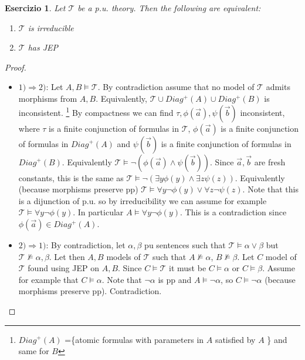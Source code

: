 \documentclass{article}
\newtheorem{exercise}{Esercizio}
\begin{document}
\begin{exercise}

	Let $\mathcal{T}$ be a p.u. theory. Then the following are equivalent:
	\begin{enumerate}
		\item	$\mathcal{T}$ is irreducible
		\item	$\mathcal{T}$ has JEP
	\end{enumerate}
\end{exercise}

\begin{proof}

	\begin{itemize}
		\item	$1) \Rightarrow 2)$: Let $A,B \models \mathcal{T}$. By contradiction assume that no model of $\mathcal{T}$
			admits morphisms from $A,B$. Equivalently, $\mathcal{T} \cup Diag^+(A) \cup Diag^+(B)$ is inconsistent.
			\footnote{$Diag^+(A)$ =\{atomic formulas with parameters in $A$ satisfied by $A$ \} and same for $B$}
			By compactness we can find $\tau, \phi(\vec{a}), \psi(\vec{b})$ inconsistent, where
			$\tau$ is a finite conjunction of formulas in $\mathcal{T}$, 
			$\phi(\vec{a})$ is a finite conjunction of formulas in $Diag^{+}(A)$ and
			$\psi(\vec{b})$ is a finite conjunction of formulas in $Diag^{+}(B)$.
			Equivalently $\mathcal{T} \models \neg(\phi(\vec{a}) \land \psi(\vec{b}))$.
			Since $\vec{a},\vec{b}$ are fresh constants, this is the same as
			$\mathcal{T} \models \neg(\exists y \phi(y) \land \exists z \psi(z))$.
			Equivalently  (because morphisms preserve pp) $\mathcal{T} \models \forall y \neg \phi(y) \lor \forall z \neg \psi(z)$.
			Note that this is a dijunction of p.u. so by irreducibility we can assume for example
			$\mathcal{T} \models \forall y \neg \phi(y)$.
			In particular $A \models \forall y \neg \phi(y)$.
			This is a contradiction since $\phi(\vec{a}) \in Diag^+(A)$.
		
		\item	$2) \Rightarrow 1)$: By contradiction, let $\alpha, \beta$ pu sentences such that 
			$\mathcal{T} \models \alpha \lor \beta$ but $\mathcal{T} \not \models \alpha,\beta$.
			Let then $A,B$ models of $\mathcal{T}$ such that $A \not \models \alpha$, $B \not \models \beta$.
			Let $C$ model of $\mathcal{T}$ found using JEP on $A,B$.
			Since $C \models \mathcal{T}$ it must be $C \models \alpha$ or $C \models \beta$.
			Assume for example that $C \models \alpha$.
			Note that $\neg \alpha$ is pp and $A \models \neg \alpha$, so $C \models \neg \alpha$ (because morphisms preserve pp).
			Contradiction.
	\end{itemize}
\end{proof}
\end{document}

